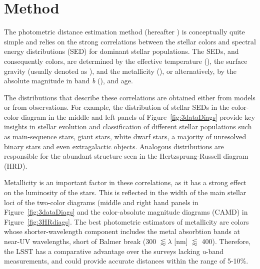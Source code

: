 
\section{Method} \label{sec:method}

The photometric distance estimation method (hereafter \pd) is conceptually quite simple and relies on the strong correlations between the stellar colors and spectral energy distributions (SED) for dominant stellar populations. The SEDs, and consequently colors, are determined by the effective temperature (\teff), the surface gravity (usually denoted as \logg), and the metallicity (\mh), or alternatively, by the absolute magnitude in band \textit{b} (\Mb), \mh and age.

The distributions that describe these correlations are obtained either from models or from observations. For example, the distribution of stellar SEDs in the color-color diagram in the middle and left panels of Figure~\ref{fig:3dataDiags} provide key insights in stellar evolution and classification of different stellar populations such as main-sequence stars, giant stars, white dwarf stars, a majority of unresolved binary stars and even extragalactic objects. Analogous distributions are responsible for the abundant structure seen in the Hertzsprung-Russell diagram (HRD).

\begin{figure*}[ht!]
	\caption{The red dots in the left panel show color-magnitude diagram for 841,000 stars from the SDSS Stripe 82 Standard Star Catalog that have Gaia matches within 0.15 arcsec (after correcting for proper motion using Gaia measurements). A subset of 415,000 stars with $r < 22$ and $u<22$ are overplotted as blue dots, and 409,000 of those that also have $0.2 < g-i < 3.5$ are overplotted as cyan dots. Finally, 63,000 stars that have signal-to-noise ratio for Gaia’s parallax measurements of at least 20 are shown as green dots. The same color scheme is used in other two panels. The three yellow lines in the middle panel show stellar locus parametrization used by Green et al. (2014) for three values of metallicity (left to right): $[Fe/H] = -2.0, -1.0, 0.0$. In the right panel, the impact of metallicity on color-color tracks is negligible and all three are indistinguishable from each other. } \label{fig:3dataDiags}
\end{figure*}

Metallicity is an important factor in these correlations, as it has a strong effect on the luminosity of the stars. This is reflected in the width of the main stellar loci of the two-color diagrams (middle and right hand panels in Figure~\ref{fig:3dataDiags} and the color-absolute magnitude diagrams (CAMD) in Figure~\ref{fig:3HRdiags}. The best photometric estimators of metallicity are colors whose shorter-wavelength component includes the metal absorbtion bands at near-UV wavelengths, short of Balmer break (300 $\lessapprox\lambda$ [nm] $\lessapprox$ 400). Therefore, the LSST has a comparative advantage over the surveys lacking \textit{u}-band measurements, and could provide accurate distances within the range of 5-10\%. 

